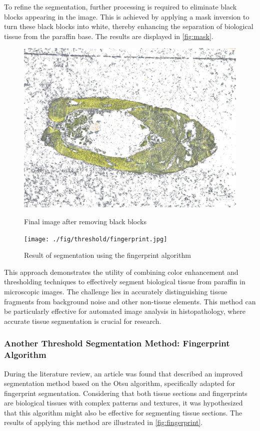 To refine the segmentation, further processing is required to eliminate black blocks appearing in the image. This is achieved by applying a mask inversion to turn these black blocks into white, thereby enhancing the separation of biological tissue from the paraffin base. The results are displayed in \autoref{fig:mask}.

\begin{figure}[H]
    \centering
    \begin{minipage}{0.45\textwidth}
        \centering
        \includegraphics[width=\textwidth]{./fig/threshold/final.jpg}
        \caption{Final image after removing black blocks}
        \label{fig:mask}
    \end{minipage}
    \begin{minipage}{0.45\textwidth}
        \centering
        \texttt{[image: ./fig/threshold/fingerprint.jpg]}
        \caption{Result of segmentation using the fingerprint algorithm}
        \label{fig:fingerprint}
    \end{minipage}
\end{figure}

This approach demonstrates the utility of combining color enhancement and thresholding techniques to effectively segment biological tissue from paraffin in microscopic images. The challenge lies in accurately distinguishing tissue fragments from background noise and other non-tissue elements. This method can be particularly effective for automated image analysis in histopathology, where accurate tissue segmentation is crucial for research.

\subsubsection{Another Threshold Segmentation Method: Fingerprint Algorithm}
During the literature review, an article was found that described an improved segmentation method based on the Otsu algorithm, specifically adapted for fingerprint segmentation. Considering that both tissue sections and fingerprints are biological tissues with complex patterns and textures, it was hypothesized that this algorithm might also be effective for segmenting tissue sections. The results of applying this method are illustrated in \autoref{fig:fingerprint}.

